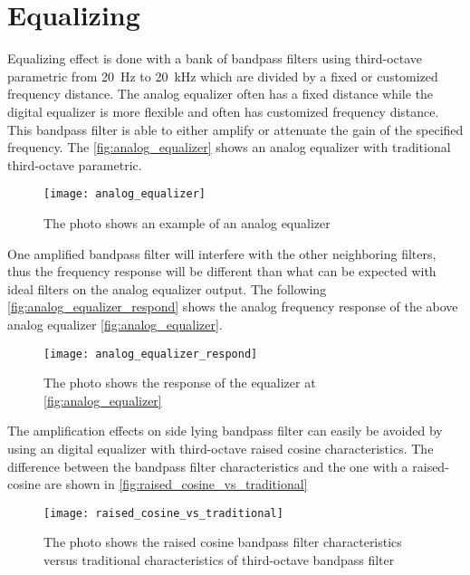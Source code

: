 \section{Equalizing}
Equalizing effect is done with a bank of bandpass filters using third-octave parametric from \SI{20}{\hertz} to \SI{20}{\kilo\hertz} which are divided by a fixed or customized frequency distance. The analog equalizer often has a fixed distance while the digital equalizer is more flexible and often has customized frequency distance. This bandpass filter is able to either amplify or attenuate the gain of the specified frequency. The \autoref{fig:analog_equalizer} shows an analog equalizer with traditional third-octave parametric. %

\begin{figure} [htbp]
 \centering
  \texttt{[image: analog\_equalizer]}
  \caption{The photo shows an example of an analog equalizer}
  \label{fig:analog_equalizer}
\end{figure}

One amplified bandpass filter will interfere with the other neighboring filters, thus the frequency response will be different than what can be expected with ideal filters on the analog equalizer output. The following \autoref{fig:analog_equalizer_respond} shows the analog frequency response of the above analog equalizer \autoref{fig:analog_equalizer}.

\begin{figure} [htbp]
 \centering
  \texttt{[image: analog\_equalizer\_respond]}
  \caption{The photo shows the response of the equalizer at \autoref{fig:analog_equalizer} }
  \label{fig:analog_equalizer_respond}
\end{figure}

The amplification effects on side lying bandpass filter can easily be avoided by using an digital equalizer with third-octave raised cosine characteristics. The difference between the  bandpass filter characteristics and the one with a raised-cosine are shown in \autoref{fig:raised_cosine_vs_traditional}

\begin{figure} [htbp]
 \centering
  \texttt{[image: raised\_cosine\_vs\_traditional]}
  \caption{The photo shows the raised cosine bandpass filter characteristics versus traditional characteristics of third-octave bandpass filter %
  }
  \label{fig:raised_cosine_vs_traditional}
\end{figure}



